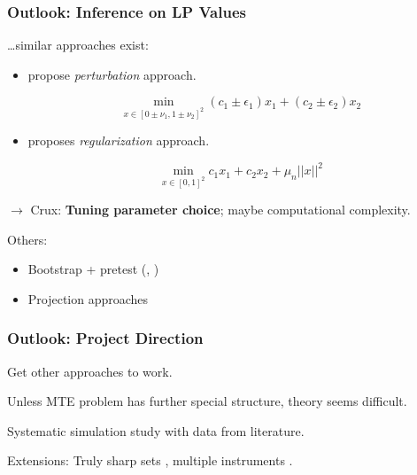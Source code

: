 \documentclass[11pt, aspectratio=169]{beamer}
\begin{document}
\begin{frame}[label=outlook_relax]
    \frametitle{Outlook: Inference on LP Values}

    \dots similar approaches exist:
    \begin{itemize}
        \item\citet{cho2024simple} propose \textit{perturbation} approach.

            \[\min_{x\in[0\pm\nu_1,1\pm\nu_2]^2} (c_1 \pm \epsilon_1)x_1 + (c_2 \pm \epsilon_2)x_2\]

        \item\citet{gafarov2024simple} proposes \textit{regularization} approach.

            \[\min_{x\in[0,1]^2} c_1x_1 + c_2x_2 + \mu_n||x||^2\]

        \end{itemize}
    \pause
    $\rightarrow$ Crux: \textbf{Tuning parameter choice}; maybe computational complexity.

    \vspace{0.5cm}

    Others:
    \begin{itemize}
        \item Bootstrap + pretest (\citet{bhattacharya2009inferring}, \citet{freyberger2015identification})
        \item Projection approaches
    \end{itemize}

\end{frame}

\begin{frame}

    \frametitle{Outlook: Project Direction}

    Get other approaches to work.

    \vspace{0.5cm}

    Unless MTE problem has further special structure, theory seems difficult.

    \vspace{0.5cm}

    Systematic simulation study with data from literature.

    \vspace{0.5cm}

    Extensions: Truly sharp sets \citep{marx2024sharp}, multiple instruments \citep{mogstad2024policy}.

\end{frame}
\end{document}

